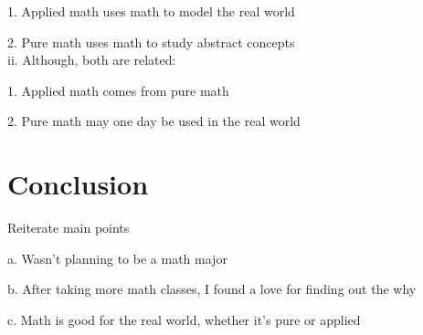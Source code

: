 \documentclass[12pt]{article}
\begin{document}
	1.	Applied math uses math to model the real world
	
	2.	Pure math uses math to study abstract concepts\\
ii.	Although, both are related:
	
	1.	Applied math comes from pure math
	
	2.	Pure math may one day be used in the real world





\section*{Conclusion}
Reiterate main points

a.	Wasn't planning to be a math major

b.	After taking more math classes, I found a love for finding out the why

c.	Math is good for the real world, whether it's pure or applied
\end{document}
